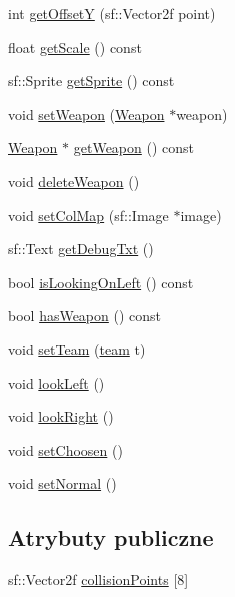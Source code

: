 \begin{DoxyCompactItemize}
\item 
int \mbox{\hyperlink{class_worm_a5a9fb6f1859a7b5cf6c447ea3ae0c1e5}{get\+OffsetY}} (sf\+::\+Vector2f point)
\item 
float \mbox{\hyperlink{class_worm_a72cf5070503bcba6423773de3367cdfd}{get\+Scale}} () const
\item 
sf\+::\+Sprite \mbox{\hyperlink{class_worm_a9b314b9a4bb91830aac7f616ef071c07}{get\+Sprite}} () const
\item 
void \mbox{\hyperlink{class_worm_a9f2a337a176e5186c7227880337c98c3}{set\+Weapon}} (\mbox{\hyperlink{class_weapon}{Weapon}} $\ast$weapon)
\item 
\mbox{\hyperlink{class_weapon}{Weapon}} $\ast$ \mbox{\hyperlink{class_worm_a42f56e4d14502d65c500fb20bd31a561}{get\+Weapon}} () const
\item 
void \mbox{\hyperlink{class_worm_adbede9b2b03f764f71629a299aec5299}{delete\+Weapon}} ()
\item 
void \mbox{\hyperlink{class_worm_af851e558c46b33b245b96a43bb2e5c56}{set\+Col\+Map}} (sf\+::\+Image $\ast$image)
\item 
sf\+::\+Text \mbox{\hyperlink{class_worm_afed2a8beb878659d49977440293ef884}{get\+Debug\+Txt}} ()
\item 
bool \mbox{\hyperlink{class_worm_a3a90a91ddbe99e67f48e54a57d12b5c7}{is\+Looking\+On\+Left}} () const
\item 
bool \mbox{\hyperlink{class_worm_a15fc66d733ecfe886495910f591d1a34}{has\+Weapon}} () const
\item 
void \mbox{\hyperlink{class_worm_a8eb6b3e55c2e6cb7c87b1593f34dac52}{set\+Team}} (\mbox{\hyperlink{_worm_8h_ae79581ee1998185d7cb41ab84352b97e}{team}} t)
\item 
void \mbox{\hyperlink{class_worm_a84fbbdac67be083a5492bf38cf83544b}{look\+Left}} ()
\item 
void \mbox{\hyperlink{class_worm_a4dbc714c26c5b09a94bd53f10172b4c1}{look\+Right}} ()
\item 
void \mbox{\hyperlink{class_worm_ac5daf6e0926f483415886c5ae297714a}{set\+Choosen}} ()
\item 
void \mbox{\hyperlink{class_worm_ab316cd13ecdfe9696e28687bfce47a4c}{set\+Normal}} ()
\end{DoxyCompactItemize}
\subsection*{Atrybuty publiczne}
\begin{DoxyCompactItemize}
\item 
sf\+::\+Vector2f \mbox{\hyperlink{class_worm_a6e519d20cdeca0c88847c0b7284ca302}{collision\+Points}} \mbox{[}8\mbox{]}
\end{DoxyCompactItemize}

